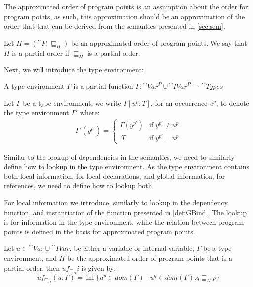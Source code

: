 \documentclass[../../master.tex]{subfiles}
\begin{document}
The approximated order of program points is an assumption about the order for program points, as such, this approximation should be an approximation of the order that that can be derived from the semantics presented in \cref{sec:sem}.

\begin{definition}
	Let $\Pi=(\cat{P},\sqsubseteq_\Pi)$ be an approximated order of program points.
	We say that $\Pi$ is a partial order if $\sqsubseteq_\Pi$ is a partial order.
\end{definition}
\bigskip

Next, we will introduce the type environment:
\begin{definition}
	A type environment $\Gamma$ is a partial function $\Gamma:\cat{Var}^P\cup\cat{IVar}^P\rightharpoonup\cat{Types}$
\end{definition}

\begin{definition}
	Let $\Gamma$ be a type environment, we write $\Gamma[u^p:T]$, for an occurrence $u^p$, to denote the type environment $\Gamma'$ where:
	\begin{align*}
		\Gamma'(y^{p'})=
		\left\{\begin{matrix}
			\Gamma(y^{p'}) & \mbox{if}\;y^{p'}\neq u^{p}\\\	 
			T & \mbox{if}\;y^{p'}=u^{p}
		\end{matrix}\right.
	\end{align*}
\end{definition}

Similar to the lookup of dependencies in the semantics, we need to similarly define how to lookup in the type environment.
As the type environment contains both local information, for local declarations, and global information, for references, we need to define how to lookup both.

For local information we introduce, similarly to lookup in the dependency function, and instantiation of the function presented in \cref{def:GBind}.
The lookup is for information in the type environment, while the relation between program points is defined in the basis for approximated program points.

\begin{definition}[]\label{def:GBindPi}
	Let $u\in \cat{Var}\cup\cat{IVar}$, be either a variable or internal variable, $\Gamma$ be a type environment, and $\Pi$ be the approximated order of program points that is a partial order, then $uf_{\sqsubseteq_\Pi}i$ is given by:
	$$uf_{\sqsubseteq_\Pi}(u,\Gamma)=\inf\{u^p\in dom(\Gamma)\mid u^q\in dom(\Gamma).q\sqsubseteq_\Pi p\}$$
\end{definition}
\end{document}
